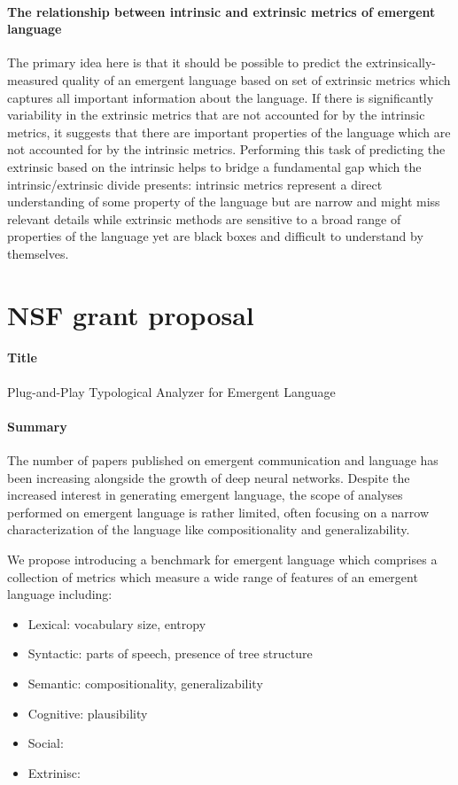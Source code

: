 \paragraph{The relationship between intrinsic and extrinsic metrics of emergent language}
The primary idea here is that it should be possible to predict the extrinsically-measured quality of an emergent language based on set of extrinsic metrics which captures all important information about the language.
If there is significantly variability in the extrinsic metrics that are not accounted for by the intrinsic metrics, it suggests that there are important properties of the language which are not accounted for by the intrinsic metrics.
Performing this task of predicting the extrinsic based on the intrinsic helps to bridge a fundamental gap which the intrinsic/extrinsic divide presents:
    intrinsic metrics represent a direct understanding of some property of the language but are narrow and might miss relevant details while extrinsic methods are sensitive to a broad range of properties of the language yet are black boxes and difficult to understand by themselves.


\section{NSF grant proposal}

\paragraph{Title}
Plug-and-Play Typological Analyzer for Emergent Language

\paragraph{Summary}
The number of papers published on emergent communication and language has been increasing alongside the growth of deep neural networks.
Despite the increased interest in generating emergent language, the scope of analyses performed on emergent language is rather limited, often focusing on a narrow characterization of the language like compositionality and generalizability.

We propose introducing a benchmark for emergent language which comprises a collection of metrics which measure a wide range of features of an emergent language including:
\begin{itemize}
    \item Lexical: vocabulary size, entropy
    \item Syntactic: parts of speech, presence of tree structure
    \item Semantic: compositionality, generalizability
    \item Cognitive: plausibility
    \item Social:
    \item Extrinisc:
\end{itemize}

